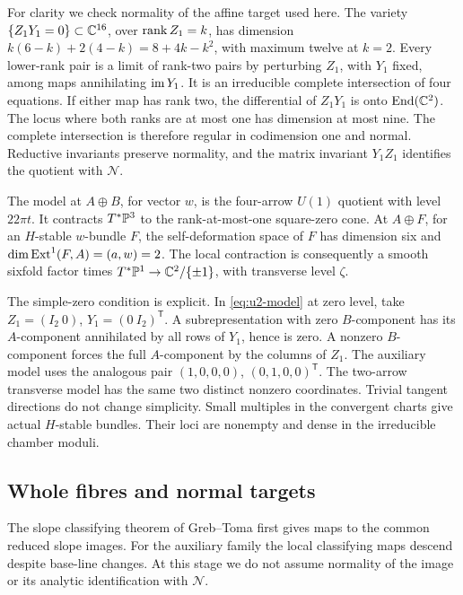 For clarity we check normality of the affine target used here.
The variety \(\{Z_1Y_1=0\}\subset\mathbb C^{16}\), over
\(\operatorname{rank} Z_1=k\), has dimension
\(k(6-k)+2(4-k)=8+4k-k^2\), with maximum twelve at \(k=2\).
Every lower-rank pair is a limit of rank-two pairs by perturbing
\(Z_1\), with \(Y_1\) fixed, among maps annihilating \(\operatorname{im} Y_1\).
It is an irreducible complete intersection of four equations.
If either map has rank two, the differential of \(Z_1Y_1\)
is onto \(\operatorname{End}(\mathbb C^2)\). The locus where both ranks are at most
one has dimension at most nine. The complete intersection is
therefore regular in codimension one and normal.
Reductive invariants preserve normality, and the matrix invariant
\(Y_1Z_1\) identifies the quotient with \(\mathcal N\).

The model at \(A\oplus B\), for vector \(w\), is the four-arrow
\(U(1)\) quotient with level \(22\pi t\). It contracts
\(T^*\mathbb P^3\) to the rank-at-most-one square-zero cone.
At \(A\oplus F\), for an \(H\)-stable \(w\)-bundle \(F\),
the self-deformation space of \(F\) has dimension six and
\(\dim\operatorname{Ext}^1(F,A)=(a,w)=2\).
The local contraction is consequently a smooth sixfold factor
times \(T^*\mathbb P^1\to\mathbb C^2/\{\pm1\}\), with transverse level
\(\zeta\).

The simple-zero condition is explicit. In \eqref{eq:u2-model}
at zero level, take
\(Z_1=(I_2\ 0)\), \(Y_1=(0\ I_2)^{\mathsf T}\).
A subrepresentation with zero \(B\)-component has its
\(A\)-component annihilated by all rows of \(Y_1\), hence is zero.
A nonzero \(B\)-component forces the full \(A\)-component by the
columns of \(Z_1\). The auxiliary model uses the analogous pair
\((1,0,0,0)\), \((0,1,0,0)^{\mathsf T}\).
The two-arrow transverse model has the same two distinct
nonzero coordinates. Trivial tangent directions do not change
simplicity. Small multiples in the convergent charts give actual
\(H\)-stable bundles. Their loci are nonempty and dense in the
irreducible chamber moduli.

\subsection{Whole fibres and normal targets}\label{subsec:targets}
The slope classifying theorem of Greb--Toma
\cite[Main Theorem, Theorem~5.5 and Remark~5.9]{grebtoma}
first gives maps to the common reduced slope images.
For the auxiliary family the local classifying maps descend
despite base-line changes. At this stage we do not assume
normality of the image or its analytic identification with
\(\mathcal N\).

